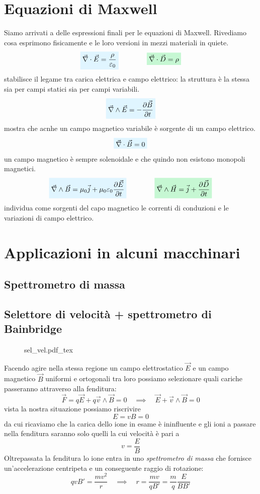 \documentclass[x11names]{report}
\newcommand{\incfig}[1]{%
	{#1.pdf_tex}
}
\newcommand{\viola}[1]{%
	\colorbox{myblue}{$\displaystyle #1$}
}
\newcommand{\rosso}[1]{%
	\colorbox{myred}{$\displaystyle #1$}}
\begin{document}
\section{Equazioni di Maxwell}
Siamo arrivati a delle espressioni finali per le equazioni di Maxwell. Rivediamo cosa esprimono fisicamente e le loro versioni in mezzi materiali in quiete.
\[
\viola{\vec{\nabla}\cdot \vec{E} = \frac{\rho}{\varepsilon_0}} \qquad \qquad \rosso{\vec{\nabla}\cdot \vec{D} = \rho}
\]
stabilisce il legame tra carica elettrica e campo elettrico: la struttura è la stessa sia per campi statici sia per campi variabili.
\[
\viola{\vec{\nabla}\wedge \vec{E} = -\frac{\partial \vec{B}}{\partial t}} 
\]
mostra che acnhe un campo magnetico variabile è sorgente di un campo elettrico.
\[
\viola{\vec{\nabla}\cdot \vec{B} = 0}
\]
un campo magnetico è sempre solenoidale e che quindo non esistono monopoli magnetici.
\[
\viola{\vec{\nabla}\wedge \vec{B} = \mu_0 \vec{j} + \mu_0\varepsilon_0\frac{\partial\vec{E}}{\partial t}} \qquad \qquad \rosso{\vec{\nabla} \wedge \vec{H} = \vec{j} + \frac{\partial \vec{D}}{\partial t}}
\]
individua come sorgenti del capo magnetico le correnti di conduzioni e le variazioni di campo elettrico.
\newpage
\section{Applicazioni in alcuni macchinari}
\subsection{Spettrometro di massa}
\subsection{Selettore di velocità + spettrometro di Bainbridge}
\begin{figure}
	\incfig{sel_vel}
\end{figure}
Facendo agire nella stessa regione un campo elettrostatico \(\vec{E}\) e un campo magnetico \(\vec{B}\) uniformi e ortogonali tra loro possiamo selezionare quali cariche passeranno attraverso alla fenditura:
\[
\vec{F} = q\vec{E} + q\vec{v}\wedge\vec{B} = 0 \quad \implies\quad \vec{E} + \vec{v} \wedge \vec{B} = 0
\]
vista la nostra situazione possiamo riscrivire
\[
E = vB = 0
\]
da cui ricaviamo che la carica dello ione in esame è ininfluente e gli ioni a passare nella fenditura saranno solo quelli la cui velocità è pari a
\[
v = \frac{E}{B}
\]
Oltrepassata la fenditura lo ione entra in uno \textit{spettrometro di massa} che fornisce un'accelerazione centripeta e un conseguente raggio di rotazione:
\[
qvB' = \frac{mv^2}{r} \quad \implies \quad r = \frac{mv}{qB'} = \frac{m}{q}\frac{E}{BB'}
\]
\end{document}
